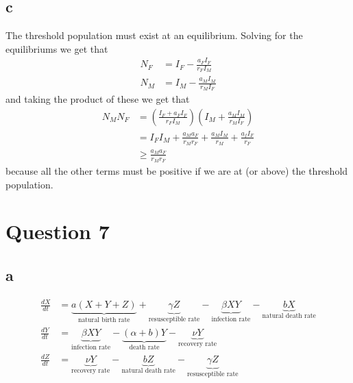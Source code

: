 \documentclass{unswmaths}
\begin{document}
\subsection*{c}
The threshold population must exist at an equilibrium. Solving for the equilibriums we get that
\begin{align*}
    N_F &= I_F - \frac{a_FI_F}{r_FI_M} \\
    N_M &= I_M - \frac{a_MI_M}{r_MI_F}
\end{align*}
and taking the product of these we get that
\begin{align*}
    N_MN_F &= \left( \frac{I_F + a_FI_F}{r_FI_M} \right) \left( I_M + \frac{a_MI_M}{r_MI_F} \right) \\
        &= I_FI_M + \frac{a_Ma_F}{r_Mr_F} + \frac{a_MI_M}{r_M} + \frac{a_fI_F}{r_F} \\
        &\geq  \frac{a_Ma_F}{r_Mr_F} 
\end{align*}
because all the other terms must be positive if we are at (or above) the threshold population.
\section*{Question 7}
\subsection*{a}
\begin{align*}
    \frac{dX}{dt} &= \underbrace{a(X+Y+Z)}_{\text{natural birth rate}} + \underbrace{\gamma Z}_{\text{resusceptible rate}} - \underbrace{\beta XY}_{\text{infection rate}} - \underbrace{bX}_{\text{natural death rate}} \\
    \frac{dY}{dt} &= \underbrace{\beta XY}_{\text{infection rate}} - \underbrace{(\alpha + b)Y}_{\text{death rate}} - \underbrace{\nu Y}_{\text{recovery rate}} \\
    \frac{dZ}{dt} &= \underbrace{\nu Y}_{\text{recovery rate}} - \underbrace{bZ}_{\text{natural death rate}} - \underbrace{\gamma Z}_{\text{resusceptible rate}}
\end{align*}
\end{document}
